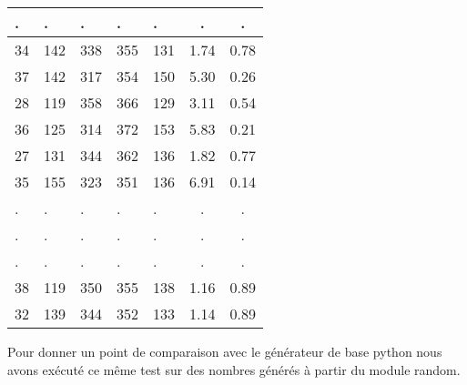 \documentclass[12pt,a4paper]{article}
\begin{document}
\begin{center}
\begin{tabular}{|l|l|l|l|l|c|c|}
 . & . & . & . & . & . & . \\ \hline
34 & 142 & 338 & 355 & 131 &  1.74 &  0.78\\ \hline
37 & 142 & 317 & 354 & 150 &  5.30 &  0.26\\ \hline
28 & 119 & 358 & 366 & 129 &  3.11 &  0.54\\ \hline
36 & 125 & 314 & 372 & 153 &  5.83 &  0.21\\ \hline
27 & 131 & 344 & 362 & 136 &  1.82 &  0.77\\ \hline
35 & 155 & 323 & 351 & 136 &  6.91 &  0.14\\ \hline
 . & . & . & . & . & . & . \\ \hline
 . & . & . & . & . & . & . \\ \hline
 . & . & . & . & . & . & . \\ \hline
38 & 119 & 350 & 355 & 138 &  1.16 &  0.89\\ \hline
32 & 139 & 344 & 352 & 133 &  1.14 &  0.89\\ \hline
\end{tabular}
\end{center}

Pour donner un point de comparaison avec le générateur de base python nous avons exécuté ce même test sur des nombres générés à partir du module random.
\end{document}
